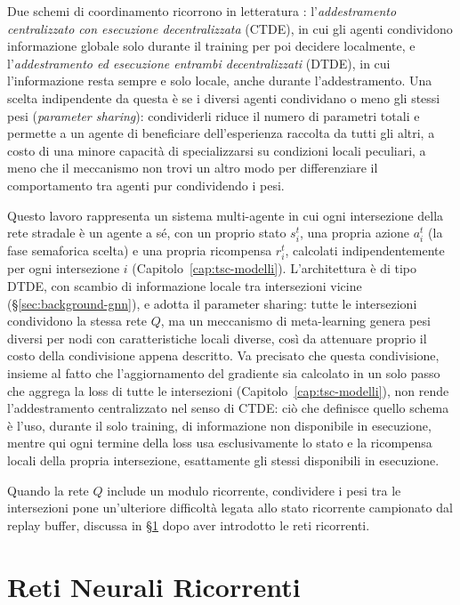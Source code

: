 Due schemi di coordinamento ricorrono in letteratura
\citep{li2018drlsurvey}: l'\emph{addestramento centralizzato con
  esecuzione decentralizzata} (CTDE), in cui gli agenti condividono
informazione globale solo durante il training per poi decidere
localmente, e l'\emph{addestramento ed esecuzione entrambi
  decentralizzati} (DTDE), in cui l'informazione resta sempre e solo
locale, anche durante l'addestramento. Una scelta indipendente da questa
è se i diversi agenti condividano o meno gli stessi pesi (\emph{parameter
  sharing}): condividerli riduce il numero di parametri totali e permette a
un agente di beneficiare dell'esperienza raccolta da tutti gli altri, a
costo di una minore capacità di specializzarsi su condizioni locali
peculiari, a meno che il meccanismo non trovi un altro modo per
differenziare il comportamento tra agenti pur condividendo i pesi.

Questo lavoro rappresenta un sistema multi-agente in cui ogni intersezione della
rete stradale è un agente a sé, con un proprio stato $s_i^t$, una propria
azione $a_i^t$ (la fase semaforica scelta) e una propria ricompensa
$r_i^t$, calcolati indipendentemente per ogni intersezione $i$
(Capitolo~\ref{cap:tsc-modelli}). L'architettura è di tipo DTDE, con scambio di
informazione locale tra intersezioni vicine (§\ref{sec:background-gnn}), e
adotta il parameter sharing: tutte le intersezioni condividono la stessa
rete $Q$, ma un meccanismo di meta-learning genera pesi diversi per nodi con caratteristiche locali diverse, così da
attenuare proprio il costo della condivisione appena descritto. Va
precisato che questa condivisione, insieme al fatto che l'aggiornamento
del gradiente sia calcolato in un solo passo che aggrega la loss di tutte
le intersezioni (Capitolo~\ref{cap:tsc-modelli}), non rende
l'addestramento centralizzato nel senso di CTDE: ciò che definisce quello
schema è l'uso, durante il solo training, di informazione non disponibile
in esecuzione, mentre qui ogni termine della loss usa esclusivamente lo
stato e la ricompensa locali della propria intersezione, esattamente gli
stessi disponibili in esecuzione.

Quando la rete $Q$ include un modulo ricorrente, condividere i pesi tra
le intersezioni pone un'ulteriore difficoltà legata allo stato ricorrente
campionato dal replay buffer, discussa in
§\ref{sec:background-rnn} dopo aver introdotto le reti ricorrenti.

\section{Reti Neurali Ricorrenti}
\label{sec:background-rnn}

